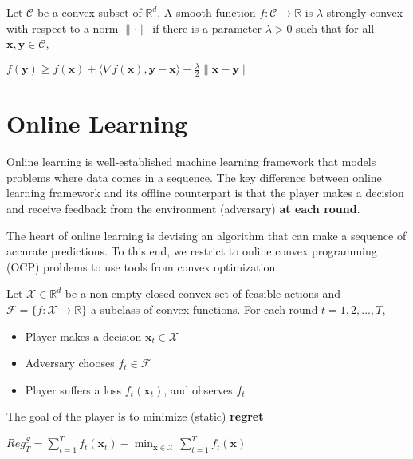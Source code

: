 \documentclass[12pt, a4paper]{report}
\begin{document}
\begin{defn}
Let $\mathcal{C}$ be a convex subset of $\mathbb{R}^d$. A smooth function $f : \mathcal{C} \rightarrow \mathbb{R}$ is $\lambda$-strongly convex with respect to a norm $\lVert \cdot \rVert$ if there is a parameter $\lambda > 0$ such that for all $\mathbf{x}, \mathbf{y} \in \mathcal{C}$, 
\begin{center}
    $\displaystyle f(\mathbf{y}) \geq f(\mathbf{x}) + \langle \nabla f(\mathbf{x}), \mathbf{y} - \mathbf{x} \rangle + \frac{\lambda}{2}\lVert \mathbf{x} - \mathbf{y} \rVert$
\end{center}
\end{defn}
\section{Online Learning}
Online learning is well-established machine learning framework that models problems where data comes in a sequence. 
The key difference between online learning framework and its offline counterpart is that the player makes a decision and receive feedback from the environment (adversary) \textbf{at each round}.

The heart of online learning is devising an algorithm that can make a sequence of accurate predictions. To this end, we restrict to online convex programming (OCP) problems to use tools from convex optimization.

\begin{defn}
Let $\mathcal{X} \in \mathbb{R}^d$ be a non-empty closed convex set of feasible actions and $\mathcal{F} = \{f : \mathcal{X} \rightarrow \mathbb{R} \}$ a subclass of convex functions. For each round $t=1,2,...,T$, 
\begin{itemize}
    \item Player makes a decision $\mathbf{x}_t \in \mathcal{X}$
    \item Adversary chooses $f_t \in \mathcal{F}$
    \item Player suffers a loss $f_t(\mathbf{x}_t)$, and observes $f_t$
\end{itemize}
The goal of the player is to minimize (static) \textbf{regret}
\begin{center}
    $\displaystyle Reg_T^{S} = \sum_{t=1}^{T} f_t(\mathbf{x}_t) - \min_{\mathbf{x} \in \mathcal{X}} \sum_{t=1}^{T} f_t(\mathbf{x})$
\end{center}
\end{defn}
\end{document}
